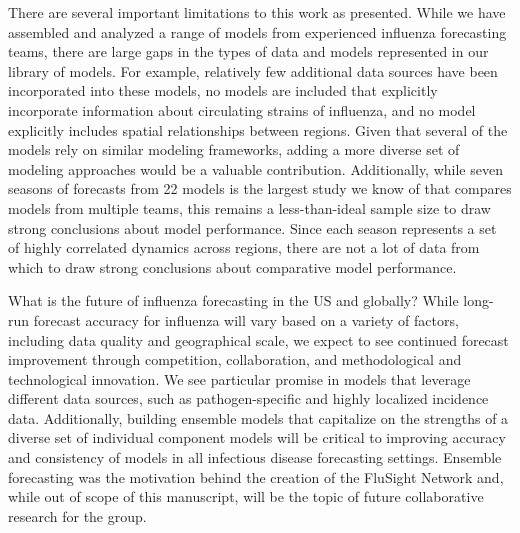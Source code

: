 \documentclass{article}\usepackage[]{graphicx}\usepackage[]{color}
\begin{document}
There are several important limitations to this work as presented.
While we have assembled and analyzed a range of models from experienced influenza forecasting teams, there are large gaps in the types of data and models represented in our library of models.
For example, relatively few additional data sources have been incorporated into these models, no models are included that explicitly incorporate information about circulating strains of influenza, and no model explicitly includes spatial relationships between regions.
Given that several of the models rely on similar modeling frameworks, adding a more diverse set of modeling approaches would be a valuable contribution.
Additionally, while seven seasons of forecasts from 22 models is the largest study we know of that compares models from multiple teams, this remains a less-than-ideal sample size to draw strong conclusions about model performance. 
Since each season represents a set of highly correlated dynamics across regions, there are not a lot of data from which to draw strong conclusions about comparative model performance.



What is the future of influenza forecasting in the US and globally? %
While long-run forecast accuracy for influenza will vary based on a variety of factors, including data quality and geographical scale, we expect to see continued forecast improvement through competition, collaboration, and methodological and technological innovation.
We see particular promise in models that leverage different data sources, such as pathogen-specific and highly localized incidence data.
Additionally, building ensemble models that capitalize on the strengths of a diverse set of individual component models will be critical to improving accuracy and consistency of models in all infectious disease forecasting settings. 
Ensemble forecasting was the motivation behind the creation of the FluSight Network and, while out of scope of this manuscript, will be the topic of future collaborative research for the group.
\end{document}
